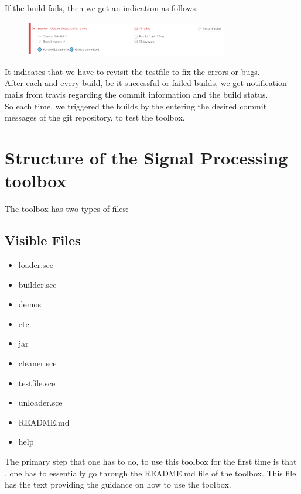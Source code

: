\documentclass[12pt,a4paper]{report}
\begin{document}
If the build fails, then we get an indication as follows:\\
\begin{figure}[H]
\centering
\includegraphics[width = 0.8\textwidth]{travisfail.png}
\end{figure}
It indicates that we have to revisit the testfile to fix the errors or bugs.\\
After each and every build, be it successful or failed builds, we get notification mails from travis regarding the commit information and the build status.\\
So each time, we triggered the builds by the entering the desired commit messages of the git repository, to test the toolbox.

\newpage













\chapter{\textbf{Structure of the Signal Processing toolbox}}
The toolbox has two types of files:
\section{Visible Files}
\begin{itemize}
\item loader.sce
\item builder.sce
\item demos
\item etc
\item jar
\item cleaner.sce
\item testfile.sce
\item unloader.sce
\item README.md
\item help
\end{itemize}

The primary step that one has to do, to use this toolbox for the first time is that , one has to essentially go through the README.md file of the toolbox. This file has the text providing the guidance on how to use the toolbox.  
\end{document}

